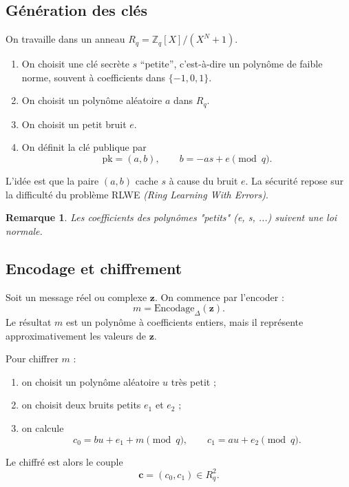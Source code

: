 \documentclass[11pt,a4paper]{article}
\newtheorem{remark}{Remarque}[section]
\begin{document}
\subsection{Génération des clés}

On travaille dans un anneau $R_q=\mathbb{Z}_q[X]/(X^N+1)$.

\begin{enumerate}[leftmargin=2em]
  \item On choisit une clé secrète $s$ ``petite'', c'est-à-dire un polynôme de faible norme, souvent à coefficients dans $\{-1,0,1\}$.
  \item On choisit un polynôme aléatoire $a$ dans $R_q$.
  \item On choisit un petit bruit $e$.
  \item On définit la clé publique par
  \[
  \text{pk}=(a,b),\qquad b=-a s + e \pmod q.
  \]
\end{enumerate}

L'idée est que la paire $(a,b)$ cache $s$ à cause du bruit $e$. La sécurité repose sur la difficulté du problème RLWE \emph{(Ring Learning With Errors)}.

\begin{remark}
    Les coefficients des polynômes "petits" (e, s, ...) suivent une loi normale.
\end{remark}

\subsection{Encodage et chiffrement}

Soit un message réel ou complexe $\mathbf{z}$. On commence par l'encoder :
\[
m=\mathrm{Encodage}_\Delta(\mathbf{z}).
\]
Le résultat $m$ est un polynôme à coefficients entiers, mais il représente approximativement les valeurs de $\mathbf{z}$.

Pour chiffrer $m$ :

\begin{enumerate}[leftmargin=2em]
  \item on choisit un polynôme aléatoire $u$ très petit ;
  \item on choisit deux bruits petits $e_1$ et $e_2$ ;
  \item on calcule
  \[
  c_0 = b u + e_1 + m \pmod q,\qquad
  c_1 = a u + e_2 \pmod q.
  \]
\end{enumerate}

Le chiffré est alors le couple
\[
\mathbf{c}=(c_0,c_1)\in R_q^2.
\]
\end{document}
